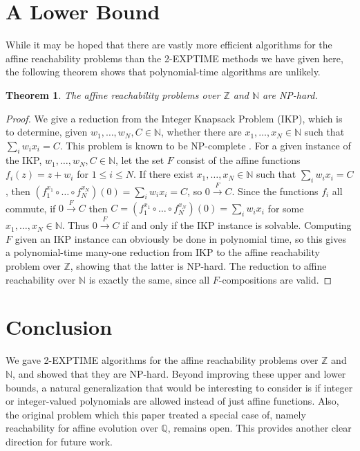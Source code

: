\documentclass[11pt]{amsart}
\newcommand{\Q}{\mathbb{Q}}
\newcommand{\N}{\mathbb{N}}
\newcommand{\Z}{\mathbb{Z}}
\newtheorem{theorem}{Theorem}
\theoremstyle{definition}
\theoremstyle{remark}
\begin{document}
\section{A Lower Bound} \label{lower-bound}

While it may be hoped that there are vastly more efficient algorithms for the affine reachability problems than the \textsf{2-EXPTIME} methods we have given here, the following theorem shows that polynomial-time algorithms are unlikely.

\begin{theorem}
The affine reachability problems over $\Z$ and $\N$ are \textsf{NP}-hard.
\end{theorem}
\begin{proof}
We give a reduction from the Integer Knapsack Problem (IKP), which is to determine, given $w_1, \dots, w_N, C \in \N$, whether there are $x_1, \dots, x_N \in \N$ such that $\sum_i w_i x_i = C$. This problem is known to be \textsf{NP}-complete \cite{lueker}. For a given instance of the IKP, $w_1, \dots, w_N, C \in \N$, let the set $F$ consist of the affine functions $f_i(z) = z + w_i$ for $1 \le i \le N$. If there exist $x_1, \dots, x_N \in \N$ such that $\sum_i w_i x_i = C$, then $(f_1^{x_1} \circ \dots \circ f_N^{x_N})(0) = \sum_i w_i x_i = C$, so $0 \xrightarrow{F} C$. Since the functions $f_i$ all commute, if $0 \xrightarrow{F} C$ then $C = (f_1^{x_1} \circ \dots \circ f_N^{x_N})(0) = \sum_i w_i x_i$ for some $x_1, \dots, x_N \in \N$. Thus $0 \xrightarrow{F} C$ if and only if the IKP instance is solvable. Computing $F$ given an IKP instance can obviously be done in polynomial time, so this gives a polynomial-time many-one reduction from IKP to the affine reachability problem over $\Z$, showing that the latter is \textsf{NP}-hard. The reduction to affine reachability over $\N$ is exactly the same, since all $F$-compositions are valid.
\end{proof}

\section{Conclusion}

We gave \textsf{2-EXPTIME} algorithms for the affine reachability problems over $\Z$ and $\N$, and showed that they are \textsf{NP}-hard. Beyond improving these upper and lower bounds, a natural generalization that would be interesting to consider is if integer or integer-valued polynomials are allowed instead of just affine functions. Also, the original problem which this paper treated a special case of, namely reachability for affine evolution over $\Q$, remains open. This provides another clear direction for future work.



\end{document}
